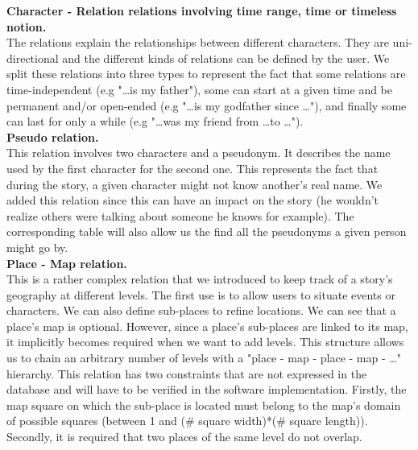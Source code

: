 \documentclass[a4paper ,12pt,french]{article}
\begin{document}
\textbf{Character - Relation relations involving time range, time or timeless notion.} \\
The relations explain the relationships between different characters. They are uni-directional and the different kinds of relations can be defined by the user.
We split these relations into three types to represent the fact that some relations are time-independent (e.g "\dots is my father"), some can start at a given time and be permanent and/or open-ended (e.g "\dots is my godfather since \dots"), and finally some can last for only a while (e.g "\dots was my friend from \dots to \dots").\\

\textbf{Pseudo relation.} \\
This relation involves two characters and a pseudonym. It describes the name used by the first character for the second one. This represents the fact that during the story, a given character might not know another's real name. We added this relation since this can have an impact on the story (he wouldn't realize others were talking about someone he knows for example).
The corresponding table will also allow us the find all the pseudonyms a given person might go by.\\

\textbf{Place - Map relation.} \\
This is a rather complex relation that we introduced to keep track of a story's geography at different levels. The first use is to allow users to situate events or characters. We can also define sub-places to refine locations. 
We can see that a place's map is optional. However, since a place's sub-places are linked to its map, it implicitly  becomes required when we want to add levels. This structure allows us to chain an arbitrary number of levels with a "place - map - place - map - \dots" hierarchy.
This relation has two constraints that are not expressed in the database and will have to be verified in the software implementation. Firstly, the map square on which the sub-place is located must belong to the map's domain of possible squares (between 1 and (\# square width)*(\# square length)). Secondly, it is required that two places of the same level do not overlap.
\end{document}
